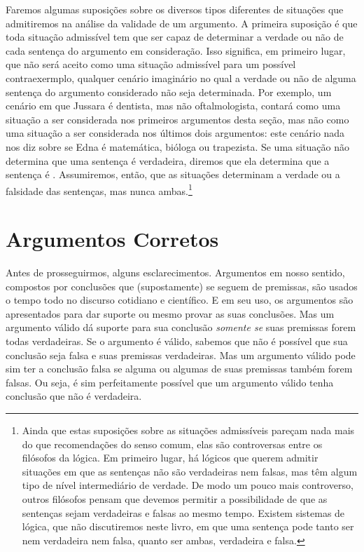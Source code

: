 Faremos algumas suposições sobre os diversos tipos diferentes de situações que admitiremos na análise da validade de um argumento.
A primeira suposição é que toda situação admissível tem que ser capaz de determinar a verdade ou não de cada sentença do argumento em consideração.
Isso significa, em primeiro lugar, que não será aceito como uma situação admissível para um possível contraexermplo, qualquer cenário imaginário no qual a verdade ou não de alguma sentença do argumento considerado não seja determinada.
Por exemplo, um cenário em que Jussara é dentista, mas não oftalmologista, contará como uma situação a ser considerada nos primeiros argumentos desta seção, mas não como uma situação a ser considerada nos últimos dois argumentos:
este cenário nada nos diz sobre se Edna é matemática, bióloga ou trapezista.
Se uma situação não determina que uma sentença é verdadeira, diremos que ela determina que a sentença é .
Assumiremos, então, que as situações determinam a verdade ou a falsidade das sentenças, mas nunca ambas.\footnote{
	Ainda que estas suposições sobre as situações admissíveis pareçam nada mais do que recomendações do senso comum, elas são controversas entre os filósofos da lógica.
Em primeiro lugar, há lógicos que querem admitir situações em que as sentenças não são verdadeiras nem falsas, mas têm algum tipo de nível intermediário de verdade.
De modo um pouco mais controverso, outros filósofos pensam que devemos permitir a possibilidade de que as sentenças sejam verdadeiras e falsas ao mesmo tempo. Existem sistemas de lógica, que não discutiremos neste livro, em que uma sentença pode tanto ser nem verdadeira nem falsa, quanto ser ambas, verdadeira e falsa.}


\section{Argumentos Corretos}

Antes de prosseguirmos, alguns esclarecimentos.
Argumentos em nosso sentido, compostos por conclusões que (supostamente) se seguem de premissas, são usados o tempo todo no discurso cotidiano e científico.
E em seu uso, os argumentos são apresentados para dar suporte ou mesmo provar as suas conclusões.
Mas um argumento válido dá suporte para sua conclusão \emph{somente se} suas premissas forem todas verdadeiras.
Se o argumento é válido, sabemos que não é possível que sua conclusão seja falsa e suas premissas verdadeiras.
Mas um argumento válido pode sim ter a conclusão falsa se alguma ou algumas de suas premissas também forem falsas.
Ou seja, é sim perfeitamente possível que um argumento válido tenha conclusão que não é verdadeira.

